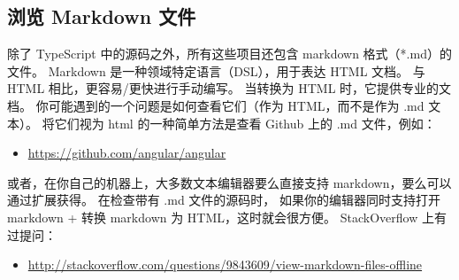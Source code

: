 \subsection{浏览 Markdown 文件}


除了 TypeScript 中的源码之外，所有这些项目还包含 markdown 格式（*.md）的文件。
Markdown 是一种领域特定语言（DSL），用于表达 HTML 文档。
与 HTML 相比，更容易/更快进行手动编写。
当转换为 HTML 时，它提供专业的文档。
你可能遇到的一个问题是如何查看它们（作为 HTML，而不是作为 .md 文本）。
将它们视为 html 的一种简单方法是查看 Github 上的 .md 文件，例如：

\begin{itemize}
  \item \url{https://github.com/angular/angular}
\end{itemize}


或者，在你自己的机器上，大多数文本编辑器要么直接支持 markdown，要么可以通过扩展获得。
在检查带有 .md 文件的源码时，
如果你的编辑器同时支持打开 markdown + 转换 markdown 为 HTML，这时就会很方便。
StackOverflow 上有过提问：

\begin{itemize}
  \item \url{http://stackoverflow.com/questions/9843609/view-markdown-files-offline}
\end{itemize}


